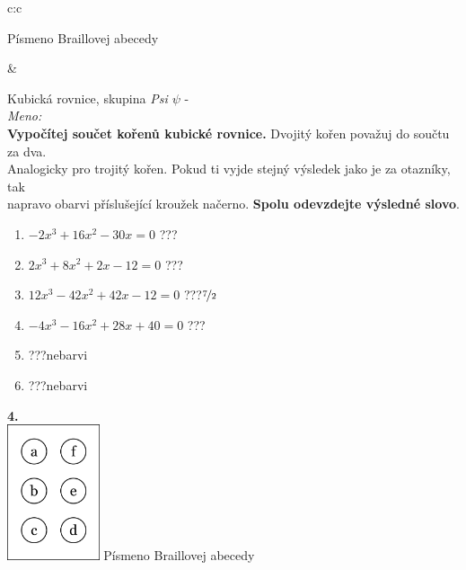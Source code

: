 \documentclass[10pt]{report}
\begin{document}
\begin{tabular}{c:c}
\begin{minipage}[c][99mm][t]{0.49\linewidth}
\begin{center}
\begin{minipage}{0.20\linewidth}
\begin{center}
{\small Písmeno Braillovej abecedy}
\end{center}
\end{minipage}
\end{center}
\end{minipage}
&
\begin{minipage}[c][99mm][t]{0.49\linewidth}
\begin{center}
\vspace{7mm}
{\huge Kubická rovnice, skupina \textit{Psi $\psi$} -}\\[4.5mm]
\textit{Meno:}\phantom{xxxxxxxxxxxxxxxxxxxxxxxxxxxxxxxxxxxxxxxxxxxxxxxxxxxxxxxxxxxxxxxxx}\\[3.5mm]
\textbf{Vypočítej součet kořenů kubické rovnice.} Dvojitý kořen považuj do součtu za dva.\\Analogicky pro trojitý kořen. Pokud ti vyjde stejný výsledek jako je za otazníky, tak\\napravo obarvi příslušející kroužek načerno. \textbf{Spolu odevzdejte výsledné slovo}.\\[3mm]
\begin{minipage}{0.77\linewidth}
\begin{center}
\begin{varwidth}{\textwidth}
\begin{enumerate}
\large
\item $-2x^3+16x^2-30x=0$\quad \dotfill\; ???\;\dotfill {}
\item $2x^3+8x^2+2x-12=0$\quad \dotfill\; ???\;\dotfill {}
\item $12x^3-42x^2+42x-12=0$\quad \dotfill\; ???\;\dotfill \quad $\nicefrac{7}{2}$
\item $-4x^3-16x^2+28x+40=0$\quad \dotfill\; ???\;\dotfill {}
\item \quad \dotfill\; ???\;\dotfill \quad nebarvi
\item \quad \dotfill\; ???\;\dotfill \quad nebarvi
\end{enumerate}
\end{varwidth}
\end{center}
\end{minipage}
\begin{minipage}{0.20\linewidth}
\begin{center}
{\Huge\bfseries 4.} \\[2mm]
\includegraphics[height=40mm]{../images/braille.png}
{\small Písmeno Braillovej abecedy}
\end{center}
\end{minipage}
\end{center}
\end{minipage}

\end{tabular}
\end{document}
